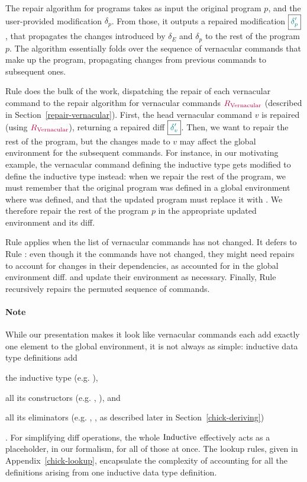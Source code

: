 

The repair algorithm for programs takes as input the original program $p$, and
the user-provided modification $\delta_p$.  From those, it outputs a repaired
modification $\boxed{ \textcolor{teal}{\delta_p'} }$, that propagates the changes introduced by
$\delta_E$ and $\delta_p$ to the rest of the program $p$.  The algorithm
essentially folds over the sequence of vernacular commands that make up the
program, propagating changes from previous commands to subsequent ones.

Rule  does the bulk of the work, dispatching the repair of
each vernacular command to the repair algorithm for vernacular commands
$\textcolor{purple}{R_{\text{Vernacular}}}$ (described in Section~\ref{repair-vernacular}).  First, the
head vernacular command $v$ is repaired (using $\textcolor{purple}{R_{\text{Vernacular}}}$), returning a
repaired diff $\boxed{ \textcolor{teal}{\delta_v'} }$.  Then, we want to repair the rest of the
program, but the changes made to $v$ may affect the global environment for the
subsequent commands.  For instance, in our motivating example, the vernacular
command defining the inductive type  gets modified to define the
inductive type  instead: when we repair the rest of the program,
we must remember that the original program was defined in a global environment
where  was defined, and that the updated program must replace it
with .  We therefore repair the rest of the program $p$ in the
appropriate updated environment and its diff.

Rule  applies when the list of vernacular commands has
not changed.  It defers to Rule : even though it the
commands have not changed, they might need repairs to account for changes in
their dependencies, as accounted for in the global environment diff.
 and  update their environment as
necessary.  Finally, Rule  recursively repairs the
permuted sequence of commands.

\paragraph{Note} While our presentation makes it look like vernacular commands
each add exactly one element to the global environment, it is not always as
simple: inductive data type definitions add \begin{enumerate*} \item the
inductive type (e.g. ), \item all its constructors
(e.g. , ), and \item all its eliminators
(e.g. , , as described later in
Section~\ref{chick-deriving}) \end{enumerate*}.  For simplifying diff
operations, the whole $\text{Inductive}$ effectively acts as a placeholder, in our
formalism, for all of those at once.  The lookup rules, given in
Appendix~\ref{chick-lookup}, encapsulate the complexity of accounting for all
the definitions arising from one inductive data type definition.
